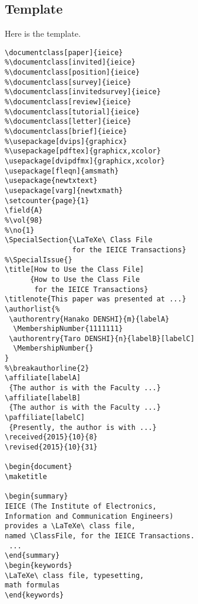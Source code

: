 \documentclass[paper]{ieice}
\def\ClassFile{\texttt{ieice.cls}}
\begin{document}
\subsection{Template}


Here is the template. 
\begin{verbatim}
\documentclass[paper]{ieice}
%\documentclass[invited]{ieice}
%\documentclass[position]{ieice}
%\documentclass[survey]{ieice}
%\documentclass[invitedsurvey]{ieice}
%\documentclass[review]{ieice}
%\documentclass[tutorial]{ieice}
%\documentclass[letter]{ieice}
%\documentclass[brief]{ieice}
%\usepackage[dvips]{graphicx}
%\usepackage[pdftex]{graphicx,xcolor}
\usepackage[dvipdfmx]{graphicx,xcolor}
\usepackage[fleqn]{amsmath}
\usepackage{newtxtext}
\usepackage[varg]{newtxmath}
\setcounter{page}{1}
\field{A}
%\vol{98}
%\no{1}
\SpecialSection{\LaTeXe\ Class File 
                for the IEICE Transactions}
%\SpecialIssue{}
\title[How to Use the Class File]
      {How to Use the Class File 
       for the IEICE Transactions}
\titlenote{This paper was presented at ...}
\authorlist{%
 \authorentry{Hanako DENSHI}{m}{labelA}
  \MembershipNumber{1111111}
 \authorentry{Taro DENSHI}{n}{labelB}[labelC]
  \MembershipNumber{}
}
%\breakauthorline{2}
\affiliate[labelA]
 {The author is with the Faculty ...}
\affiliate[labelB]
 {The author is with the Faculty ...}
\paffiliate[labelC]
 {Presently, the author is with ...}
\received{2015}{10}{8}
\revised{2015}{10}{31}

\begin{document}
\maketitle

\begin{summary}
IEICE (The Institute of Electronics, 
Information and Communication Engineers) 
provides a \LaTeXe\ class file, 
named \ClassFile, for the IEICE Transactions. 
 ...
\end{summary}
\begin{keywords}
\LaTeXe\ class file, typesetting, 
math formulas
\end{keywords}

\end{verbatim}
\end{document}
